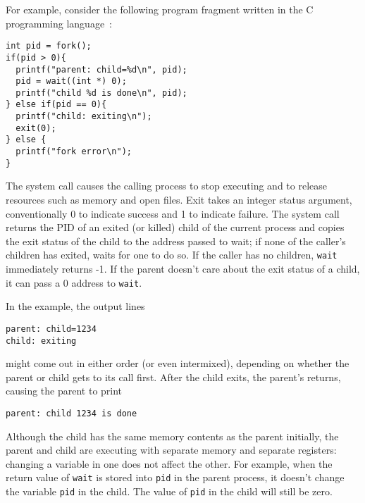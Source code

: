 \iffalse
For example, consider the following program fragment written in the C
programming language~\cite{kernighan}:
\begin{lstlisting}[]
int pid = fork();
if(pid > 0){
  printf("parent: child=%d\n", pid);
  pid = wait((int *) 0);
  printf("child %d is done\n", pid);
} else if(pid == 0){
  printf("child: exiting\n");
  exit(0);
} else {
  printf("fork error\n");
}
\end{lstlisting}
The
system call causes the calling process to stop executing and
to release resources such as memory and open files.
Exit takes an integer status argument,
conventionally 0 to indicate success and 1 to indicate failure.
The
system call returns the PID of an exited (or killed) child of the
current process and copies the exit status of the child to the address
passed to wait; if none of the caller's children
has exited,
waits for one to do so.
If the caller has no children, \lstinline{wait} immediately
returns -1.
If the parent doesn't care about the exit status of a child, it can
pass a 0 address to
\lstinline{wait}.

In the example, the output lines
\begin{lstlisting}[]
parent: child=1234
child: exiting
\end{lstlisting}
might come out in either order (or even intermixed), depending on whether the
parent or child gets to its
call first.
After the child exits, the parent's
returns, causing the parent to print
\begin{lstlisting}[]
parent: child 1234 is done
\end{lstlisting}
Although the child has the same memory contents as the parent initially, the
parent and child are executing with separate memory and separate registers:
changing a variable in one does not affect the other. For example, when the
return value of
\lstinline{wait}
is stored into
\lstinline{pid}
in the parent process,
it doesn't change the variable
\lstinline{pid}
in the child.  The value of
\lstinline{pid}
in the child will still be zero.

